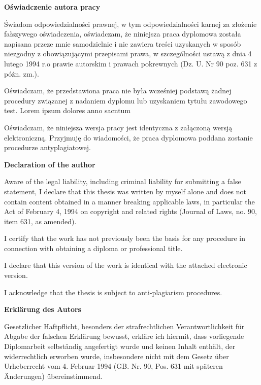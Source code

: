 \thispagestyle{empty}

\begin{singlespace}
	\begin{po}
		\begin{center}
			\textbf{Oświadczenie autora pracy}
		\end{center}
		Świadom odpowiedzialności prawnej, w tym odpowiedzialności karnej za złożenie fałszywego oświadczenia, oświadczam, że niniejsza praca dyplomowa została napisana przeze mnie samodzielnie i nie zawiera treści uzyskanych w sposób niezgodny z obowiązującymi przepisami prawa, w szczególności ustawą z dnia 4 lutego 1994 r.o prawie autorskim i prawach pokrewnych (Dz. U. Nr 90 poz. 631 z późn. zm.).
		
		Oświadczam, że przedstawiona praca nie była wcześniej podstawą żadnej procedury związanej z nadaniem dyplomu lub uzyskaniem tytułu zawodowego test. Lorem ipsum dolores anno sacntum
		
		Oświadczam, że niniejsza wersja pracy jest identyczna z załączoną wersją elektroniczną. Przyjmuję do wiadomości, że praca dyplomowa poddana zostanie procedurze antyplagiatowej.
	\end{po}
	\begin{center}
		\textbf{Declaration of the author}
	\end{center}
	Aware of the legal liability, including criminal liability for submitting a false statement, I
	declare that this thesis was written by myself alone and does not contain content obtained in
	a manner breaking applicable laws, in particular the Act of February 4, 1994 on copyright
	and related rights (Journal of Laws, no. 90, item 631, as amended).
	
	I certify that the work has not previously been the basis for any procedure in connection with
	obtaining a diploma or professional title.
	
	I declare that this version of the work is identical with the attached electronic version.
	
	I acknowledge that the thesis is subject to anti-plagiarism procedures.
	\begin{de}
		\begin{center}
			\textbf{Erklärung des Autors}
		\end{center}
		Gesetzlicher Haftpflicht, besonders der strafrechtlichen Verantwortlichkeit für Abgabe der falschen Erklärung bewusst, erkläre ich hiermit, dass vorliegende Diplomarbeit selbständig angefertigt wurde und keinen Inhalt enthält, der widerrechtlich erworben wurde, insbesondere nicht mit dem Gesetz über Urheberrecht vom 4. Februar 1994 (GB. Nr. 90, Pos. 631 mit späteren Änderungen) übereinstimmend.
		

\end{de}
\end{singlespace}
